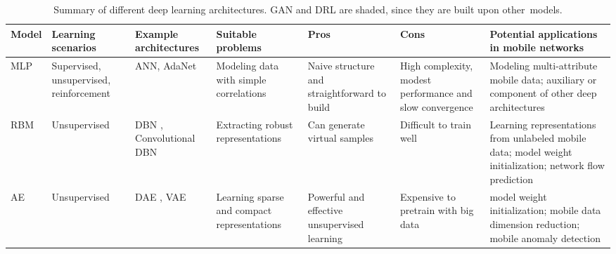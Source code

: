 \documentclass[journal,comsoc,letter]{IEEEtran}
\begin{document}
\begin{table*}[h]
\centering
\caption{Summary of different deep learning architectures. GAN and DRL are shaded, since they are built upon other~models.}
\label{tab:model}
\begin{tabular}{|C{1cm}|C{1.8cm}|C{2.3cm}|C{2cm}|C{2.5cm}|C{2.5cm}|C{2.5cm}|}
\hline
\textbf{Model}     & \textbf{Learning scenarios} & \textbf{Example architectures} & \textbf{Suitable problems} & \textbf{Pros} & \textbf{Cons} & \textbf{Potential applications in mobile networks} \\ \hline
MLP       &    Supervised, unsupervised, reinforcement    &        ANN, AdaNet~\cite{cortes2017adanet}      &   Modeling data with simple correlations          &  Naive structure and straightforward to build     &   High complexity, modest performance and slow convergence   &          Modeling multi-attribute mobile data; auxiliary or component of other deep architectures        \\ \hline

RBM     &       Unsupervised            &          DBN \cite{hinton2006fast}, Convolutional DBN~\cite{lee2009convolutional}       &     Extracting robust representations     &    Can generate virtual samples     &   Difficult to train well   &             Learning representations from unlabeled mobile data; model weight initialization; network flow prediction                 \\ \hline

AE     &       Unsupervised            &  DAE \cite{vincent2010stacked}, VAE~\cite{kingma2014auto}        &     Learning  sparse and compact representations         &    Powerful and effective unsupervised learning    &   Expensive to pretrain with big data   &          model weight initialization; mobile data dimension reduction; mobile anomaly detection                               \\ \hline


\end{tabular}
\end{table*}
\end{document}
